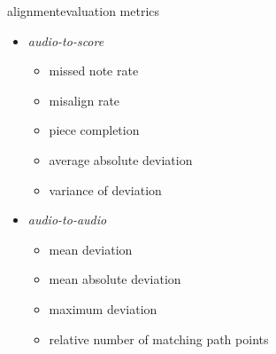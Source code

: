         \begin{frame}{alignment}{evaluation metrics}
            \begin{itemize}
                \item   \textit{audio-to-score}
                    \begin{itemize}
                        \item   missed note rate
                        \item   misalign rate
                        \item   piece completion
                        \item   average absolute deviation
                        \item   variance of deviation
                    \end{itemize}
                \bigskip
                \item   \textit{audio-to-audio}
                    \begin{itemize}
                        \item   mean deviation
                        \item   mean absolute deviation
                        \item   maximum deviation
                        \item   relative number of matching path points
                    \end{itemize}
            \end{itemize}
        \end{frame}

    
